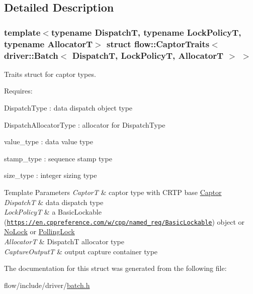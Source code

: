 \subsection{Detailed Description}
\subsubsection*{template$<$typename DispatchT, typename Lock\+PolicyT, typename AllocatorT$>$\newline
struct flow\+::\+Captor\+Traits$<$ driver\+::\+Batch$<$ Dispatch\+T, Lock\+Policy\+T, Allocator\+T $>$ $>$}

Traits struct for captor types. 

Requires\+:
\begin{DoxyItemize}
\item {\ttfamily Dispatch\+Type} \+: data dispatch object type
\item {\ttfamily Dispatch\+Allocator\+Type} \+: allocator for {\ttfamily Dispatch\+Type}
\item {\ttfamily value\+\_\+type} \+: data value type
\item {\ttfamily stamp\+\_\+type} \+: sequence stamp type
\item {\ttfamily size\+\_\+type} \+: integer sizing type
\end{DoxyItemize}


\begin{DoxyTemplParams}{Template Parameters}
{\em CaptorT} & captor type with C\+R\+TP base {\ttfamily \hyperlink{classflow_1_1_captor}{Captor}}\\
\hline
{\em DispatchT} & data dispatch type \\
\hline
{\em Lock\+PolicyT} & a Basic\+Lockable (\href{https://en.cppreference.com/w/cpp/named_req/BasicLockable}{\tt https\+://en.\+cppreference.\+com/w/cpp/named\+\_\+req/\+Basic\+Lockable}) object or \hyperlink{structflow_1_1_no_lock}{No\+Lock} or \hyperlink{structflow_1_1_polling_lock}{Polling\+Lock} \\
\hline
{\em AllocatorT} & {\ttfamily DispatchT} allocator type \\
\hline
{\em Capture\+OutputT} & output capture container type \\
\hline
\end{DoxyTemplParams}


The documentation for this struct was generated from the following file\+:\begin{DoxyCompactItemize}
\item 
flow/include/driver/\hyperlink{batch_8h}{batch.\+h}\end{DoxyCompactItemize}
